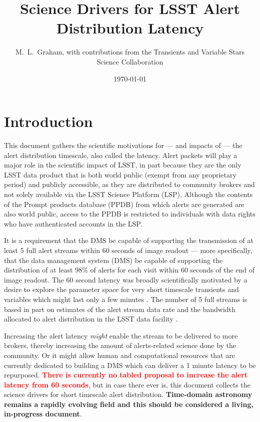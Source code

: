 \documentclass[DM,lsstdraft,authoryear,toc]{lsstdoc}
\title[Alerts Latency]{Science Drivers for LSST Alert Distribution Latency}
\author{%
M.~L.~Graham, with contributions from the Transients and Variable Stars Science Collaboration
}
\date{\today}
\begin{document}

\maketitle

\section{Introduction} \label{sec:intro}


This document gathers the scientific motivations for --- and impacts of --- the alert distribution timescale, also called the latency.
Alert packets will play a major role in the scientific impact of LSST, in part because they are the only LSST data product that is both world public (exempt from any proprietary period) and publicly accessible, as they are distributed to community brokers and not solely available via the LSST Science Platform (LSP).
Although the contents of the Prompt products database (PPDB) from which alerts are generated are also world public, access to the PPDB is restricted to individuals with data rights  who have authenticated accounts in the LSP.

It is a requirement that the DMS be capable of supporting the transmission of at least 5 full alert streams within 60 seconds of image readout --- more specifically, that the data management system (DMS) be capable of supporting the distribution of at least 98\% of alerts for each visit within 60 seconds of the end of image readout.
The 60 second latency was broadly scientifically motivated by a desire to explore the parameter space for very short timescale transients and variables which might last only a few minutes .
The number of 5 full streams is based in part on estimates of the alert stream data rate and the bandwidth allocated to alert distribution in the LSST data facility .

Increasing the alert latency \emph{might} enable the stream to be delivered to more brokers, thereby increasing the amount of alerts-related science done by the community.
Or it might allow human and computational resources that are currently dedicated to building a DMS which can deliver a 1 minute latency to be repurposed. 
\textcolor{red}{\textbf{There is currently no tabled proposal to increase the alert latency from 60 seconds}}, but in case there ever is, this document collects the science drivers for short timescale alert distribution.
\textbf{Time-domain astronomy remains a rapidly evolving field and this should be considered a living, in-progress document}.
\end{document}

